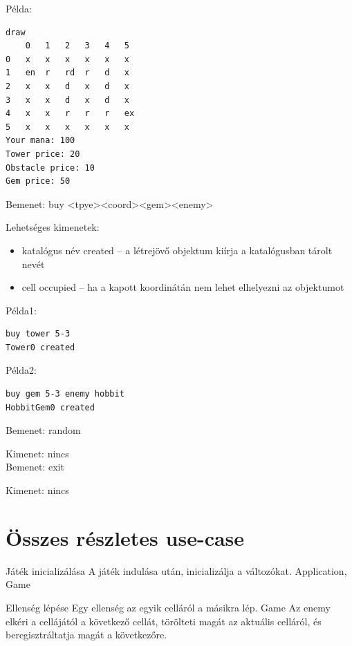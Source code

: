 Példa: 
\begin{lstlisting}
draw
	0	1	2	3	4	5
0	x	x	x	x	x	x
1	en	r	rd	r	d	x
2	x	x	d	x	d	x
3	x	x	d	x	d	x
4	x	x	r	r	r	ex
5	x	x	x	x	x	x
Your mana: 100
Tower price: 20
Obstacle price: 10
Gem price: 50
\end{lstlisting}

Bemenet: buy <tpye><coord><gem><enemy>

Lehetséges kimenetek:
\begin{itemize}
\item katalógus név created – a létrejövő objektum kiírja a katalógusban tárolt nevét
\item cell occupied – ha a kapott koordinátán nem lehet elhelyezni az objektumot
\end{itemize}

Példa1:
\begin{lstlisting}
buy tower 5-3
Tower0 created
\end{lstlisting}

Példa2: 
\begin{lstlisting}
buy gem 5-3 enemy hobbit
HobbitGem0 created
\end{lstlisting}


Bemenet: random

Kimenet: nincs
\\[6pt]

Bemenet: exit

Kimenet: nincs


\section{Összes részletes use-case}


\usecase
{Játék inicializálása}
{A játék indulása után, inicializálja a változókat.}
{Application, Game}
{}

\usecase
{Ellenség lépése}
{Egy ellenség az egyik celláról a másikra lép.}
{Game}
{Az enemy elkéri a cellájától a következő cellát, törölteti magát az aktuális celláról, és beregisztráltatja magát a következőre.}


